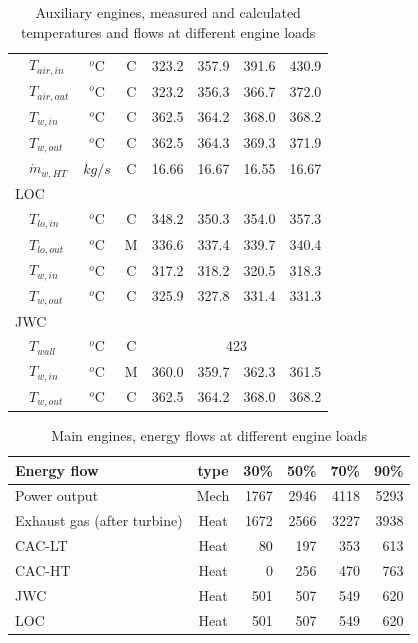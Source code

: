 \documentclass[preprint,12pt]{elsarticle}
\begin{document}
\begin{table}
\begin{tabular}{llccrrrr}
		&	$T_{air,in}$   		& $^o$C & C  & 323.2 & 357.9 & 391.6 & 430.9 \\ 
		&	$T_{air,out}$   	& $^o$C & C  & 323.2 & 356.3 & 366.7 & 372.0 \\ 
		&	$T_{w,in}$    		& $^o$C & C  & 362.5 & 364.2 & 368.0 & 368.2 \\
		&	$T_{w,out}$   		& $^o$C & C  & 362.5 & 364.3 & 369.3 & 371.9 \\
		& 	$\dot{m}_{w,HT}$  	& $kg/s$ & C & 16.66 & 16.67 & 16.55 & 16.67 \\
		\multicolumn{2}{l}{LOC} & & & & & &  \\
		&	$T_{lo,in}$   		& $^o$C & C  & 348.2 & 350.3 & 354.0 & 357.3 \\
		&	$T_{lo,out}$    	& $^o$C & M  & 336.6 & 337.4 & 339.7 & 340.4 \\
		&	$T_{w,in}$    		& $^o$C & C & 317.2 & 318.2 & 320.5 & 318.3 \\ 
		&	$T_{w,out}$   		& $^o$C & C  & 325.9 & 327.8 & 331.4 & 331.3 \\
		\multicolumn{2}{l}{JWC} & & & & & & \\
		&	$T_{wall}$    		& $^o$C & C  & \multicolumn{4}{c}{423}  \\
		&	$T_{w,in}$    		& $^o$C & M  & 360.0 & 359.7 & 362.3 & 361.5 \\
		&	$T_{w,out}$	   		& $^o$C & C  & 362.5 & 364.2 & 368.0 & 368.2 \\  
		\bottomrule
	\end{tabular}
	\caption{Auxiliary engines, measured and calculated temperatures and flows at different engine loads}
	\label{tab:AE_values}
\end{table}

\begin{table}
	\small
	\centering
	\begin{tabular}{lcrrrr}
		\toprule
		Energy flow & type & 30\% & 50\% & 70\% & 90\% \\
		\midrule
		Power output & Mech &  1767 & 2946 & 4118 & 5293 \\	
		Exhaust gas (after turbine) & Heat & 1672 & 2566 & 3227 & 3938 \\
		CAC-LT & Heat & 80 & 197 & 353 & 613 \\
		CAC-HT & Heat & 0 & 256  & 470 & 763  \\
		JWC & Heat & 501 & 507 & 549 & 620 \\
		LOC & Heat & 501 & 507 & 549 & 620 \\
		\bottomrule
	\end{tabular}
	\caption{Main engines, energy flows at different engine loads}
	\label{tab:ME_flows}
\end{table}
\end{document}
